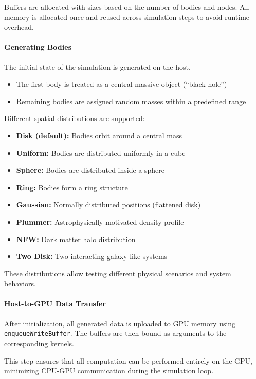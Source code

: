 \documentclass[12pt]{article}
\begin{document}
Buffers are allocated with sizes based on the number of bodies and nodes.
All memory is allocated once and reused across simulation steps to avoid
runtime overhead.

\paragraph{Generating Bodies}

The initial state of the simulation is generated on the host.

\begin{itemize}
    \item The first body is treated as a central massive object (``black hole'')
    \item Remaining bodies are assigned random masses within a predefined range
\end{itemize}

Different spatial distributions are supported:

\begin{itemize}
    \item \textbf{Disk (default):} Bodies orbit around a central mass
    \item \textbf{Uniform:} Bodies are distributed uniformly in a cube
    \item \textbf{Sphere:} Bodies are distributed inside a sphere
    \item \textbf{Ring:} Bodies form a ring structure
    \item \textbf{Gaussian:} Normally distributed positions (flattened disk)
    \item \textbf{Plummer:} Astrophysically motivated density profile
    \item \textbf{NFW:} Dark matter halo distribution
    \item \textbf{Two Disk:} Two interacting galaxy-like systems
\end{itemize}

These distributions allow testing different physical scenarios and system behaviors.

\paragraph{Host-to-GPU Data Transfer}

After initialization, all generated data is uploaded to GPU memory using
\texttt{enqueueWriteBuffer}. The buffers are then bound as arguments to the
corresponding kernels.

This step ensures that all computation can be performed entirely on the GPU,
minimizing CPU-GPU communication during the simulation loop.
\end{document}
